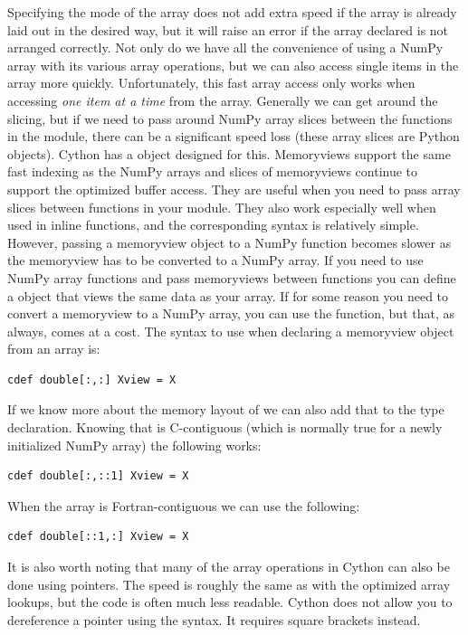 Specifying the mode of the array does not add extra speed if the array is already laid out in the desired way, but it will raise an error if the array declared is not arranged correctly.
Not only do we have all the convenience of using a NumPy array with its various array operations, but we can also access single items in the array more quickly.
Unfortunately, this fast array access only works when accessing \textit{one item at a time} from the array.
Generally we can get around the slicing, but if we need to pass around NumPy array slices between the functions in the module, there can be a significant speed loss (these array slices are Python objects).
Cython has a  object designed for this.
Memoryviews support the same fast indexing as the NumPy arrays and slices of memoryviews continue to support the optimized buffer access.
They are useful when you need to pass array slices between functions in your module.
They also work especially well when used in inline functions, and the corresponding syntax is relatively simple.
However, passing a memoryview object to a NumPy function becomes slower as the memoryview has to be converted to a NumPy array.
If you need to use NumPy array functions and pass memoryviews between functions you can define a  object that views the same data as your array.
If for some reason you need to convert a memoryview to a NumPy array, you can use the  function, but that, as always, comes at a cost.
The syntax to use when declaring a memoryview object from an array  is:
\begin{lstlisting}
cdef double[:,:] Xview = X
\end{lstlisting}
If we know more about the memory layout of  we can also add that to the type declaration.
Knowing that  is C-contiguous (which is normally true for a newly initialized NumPy array) the following works:
\begin{lstlisting}
cdef double[:,::1] Xview = X
\end{lstlisting}
When the array is Fortran-contiguous we can use the following:
\begin{lstlisting}
cdef double[::1,:] Xview = X
\end{lstlisting}

It is also worth noting that many of the array operations in Cython can also be done using pointers.
The speed is roughly the same as with the optimized array lookups, but the code is often much less readable.
Cython does not allow you to dereference a pointer using the \li{*} syntax.
It requires square brackets \li{[ ]} instead.

